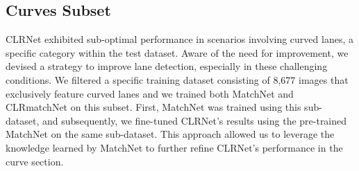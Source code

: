 \documentclass[10pt,twocolumn,letterpaper]{article}
\begin{document}
\subsection{Curves Subset}
CLRNet exhibited sub-optimal performance in scenarios involving curved lanes, a specific category within the test dataset. Aware of the need for improvement, we devised a strategy to improve lane detection, especially in these challenging conditions. We filtered a specific training dataset consisting of 8,677 images that exclusively feature curved lanes and we trained both MatchNet and CLRmatchNet on this subset. First, MatchNet was trained using this sub-dataset, and subsequently, we fine-tuned CLRNet's results using the pre-trained MatchNet on the same sub-dataset. This approach allowed us to leverage the knowledge learned by MatchNet to further refine CLRNet's performance in the curve section.
\end{document}

